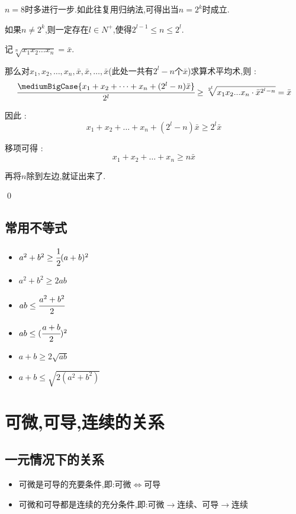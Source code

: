 {{{    $n = 8$时多进行一步.如此往复用归纳法,可得出当$n = 2^k$时成立.

    如果$n \neq 2^k$,则一定存在$l \in N^+$,使得$2^{l - 1} \leq n \leq 2^l$.

    记$\sqrt[n]{x_1x_2 \dots x_n} = \bar{x}$.

    那么对$x_1,x_2,\dots,x_n,\bar{x},\bar{x},\dots,\bar{x}$(此处一共有$2^l - n$个$\bar{x}$)求算术平均术,则 : $$
        \cfrac{\mediumBigCase{x_1+x_2+\dots+x_n+(2^l - n)\bar{x}}}{2^l} \geq \sqrt[2^l]{x_1x_2...x_n \cdot \bar{x}^{2^l - n}} = \bar{x}
    $$

    因此 : $$
        x_1 + x_2 + \dots + x_n + (2^l - n)\bar{x} \geq 2^l\bar{x}
    $$

    移项可得 : $$
        x_1 + x_2 + \dots + x_n \geq n\bar{x}
    $$

    再将$n$除到左边,就证出来了.

    \qed
}%

\subsection{常用不等式}{
    \begin{itemize}
        \item $a^2 + b^2 \geq \cfrac{1}{2}(a + b)^2$
        \item $a^2 + b^2 \geq 2ab$
        \item $ab \leq \cfrac{a^2 + b^2}{2}$
        \item $ab \leq (\cfrac{a + b}{2})^2$
        \item $a + b \geq 2\sqrt{ab}$
        \item $a + b \leq \sqrt{2(a^2 + b^2)}$
    \end{itemize}
}%

}%

\section{可微,可导,连续的关系}{

    \subsection{一元情况下的关系}{
        \begin{itemize}
            \item 可微是可导的充要条件,即:可微$\Leftrightarrow$可导
            \item 可微和可导都是连续的充分条件,即:可微$\rightarrow$连续、可导$\rightarrow$连续
        \end{itemize}

}}}
